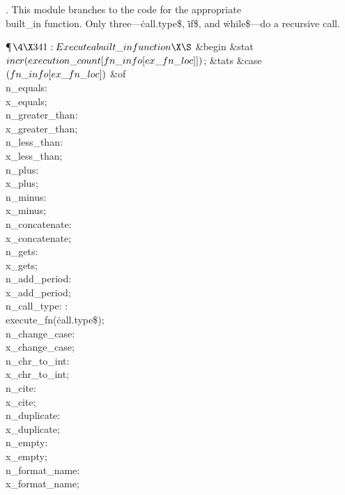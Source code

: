 .
This module branches to the code for the appropriate \\{built\_in}
function.  Only three---{\.{call.type\$}}, {\.{if\$}}, and
{\.{while\$}}---do a recursive call.

\Y\P$\4\X341:Execute a \\{built\_in} function\X\S$\6
\&{begin} \&{stat} \6
$\\{incr}(\\{execution\_count}[\\{fn\_info}[\\{ex\_fn\_loc}]])$;\6
\&{tats}\6
\&{case} $(\\{fn\_info}[\\{ex\_fn\_loc}])$ \1\&{of}\6
\4\\{n\_equals}: \\{x\_equals};\6
\4\\{n\_greater\_than}: \\{x\_greater\_than};\6
\4\\{n\_less\_than}: \\{x\_less\_than};\6
\4\\{n\_plus}: \\{x\_plus};\6
\4\\{n\_minus}: \\{x\_minus};\6
\4\\{n\_concatenate}: \\{x\_concatenate};\6
\4\\{n\_gets}: \\{x\_gets};\6
\4\\{n\_add\_period}: \\{x\_add\_period};\6
\4\\{n\_call\_type}: :\\{execute\_fn}({\.{call.type\$}})\X;\6
\4\\{n\_change\_case}: \\{x\_change\_case};\6
\4\\{n\_chr\_to\_int}: \\{x\_chr\_to\_int};\6
\4\\{n\_cite}: \\{x\_cite};\6
\4\\{n\_duplicate}: \\{x\_duplicate};\6
\4\\{n\_empty}: \\{x\_empty};\6
\4\\{n\_format\_name}: \\{x\_format\_name};\6
